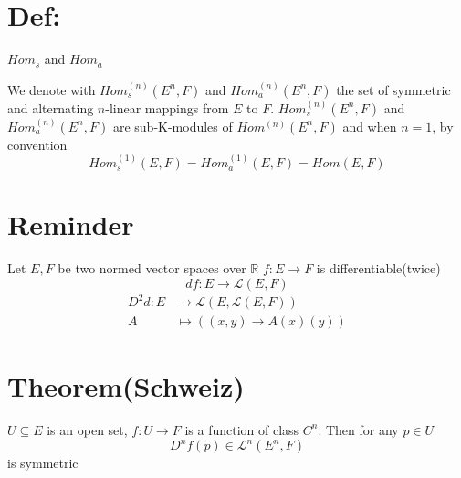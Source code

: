 \documentclass{book}
\begin{document}
\section{Def:}
$Hom_s$ and $Hom_a$

We denote with $Hom_s^{(n)}(E^n,F)$ and $Hom_a^{(n)}(E^n,F)$ the set of symmetric and alternating $n$-linear mappings from $E$ to $F$. $Hom^{(n)}_s(E^n,F)$ and $Hom^{(n)}_a(E^n,F)$ are sub-K-modules of $Hom^{(n)}(E^n,F)$ and when $n=1$, by convention$$Hom^{(1)}_s(E,F)=Hom^{(1)}_a(E,F)=Hom(E,F)$$

\section{Reminder}
 Let $E,F$ be two normed vector spaces over $\mathbb{R}$ $f:E\rightarrow F$ is differentiable(twice) $$df:E\rightarrow\mathscr{L}(E,F)$$
 $$
 \begin{aligned}
    D^2d:E &\rightarrow\mathscr{L}(E,\mathscr{L}(E,F))\\
    A &\mapsto ((x,y)\rightarrow A(x)(y))
 \end{aligned}$$
 \section{Theorem(Schweiz)}
 $U\subseteq E$ is an open set, $f:U\rightarrow F$ is a function of class $C^n$. Then for any $p\in U$$$D^nf(p)\in \mathscr{L}^n(E^n,F)$$ is symmetric
\end{document}
